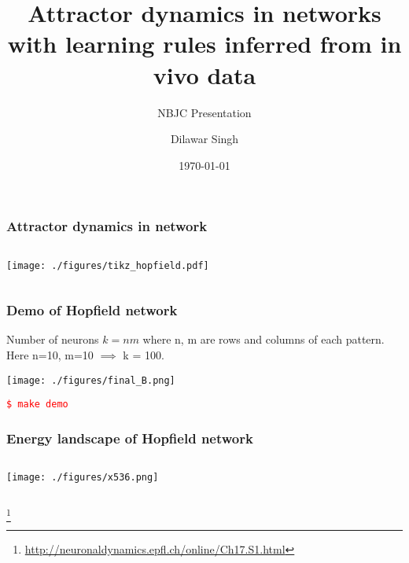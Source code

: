 \documentclass{beamer}
\title[]{Attractor dynamics in networks with learning rules inferred from in vivo data}
\subtitle{NBJC Presentation}
\author{Dilawar Singh}
\institute[NCBS] %
{
  \inst{1}%
  National Center for Biological Sciences Bangalore
}
\date[VLC 2015] %
{\today}
\begin{document}
\maketitle

\begin{frame}
    \frametitle{Attractor dynamics in network}

    \begin{columns}[c]


        \texttt{[image: ./figures/tikz\_hopfield.pdf]}


    \end{columns}
\end{frame}

\begin{frame}
    \frametitle{Demo of Hopfield network}

    Number of neurons $k=nm$ where n, m are rows and columns of each pattern.
    Here n=10, m=10 $\implies$ k = 100. 

    \texttt{[image: ./figures/final\_B.png]}
    
    \textcolor{red}{\texttt{\$ make demo}}

\end{frame}

\begin{frame}
    \frametitle{Energy landscape of Hopfield network}

    \begin{columns}[c]
        
    \texttt{[image: ./figures/x536.png]}  


%
    \end{columns}
    \footnote{\url{http://neuronaldynamics.epfl.ch/online/Ch17.S1.html}}
\end{frame}
\end{document}
